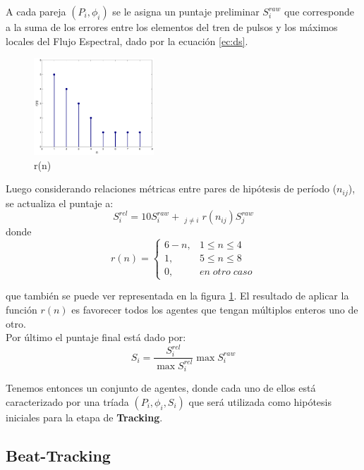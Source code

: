 \documentclass[12pt,a4paper,titlepage]{report}
\begin{document}
A cada pareja $(P_i,\phi _i)$ se le asigna un puntaje preliminar $S_i^{raw}$ que corresponde a la suma de los errores entre los elementos del tren de pulsos y los máximos locales del Flujo Espectral, dado por la ecuación \ref{ec:ds}.\\

\begin{figure}
	\vspace{-25pt}
	\begin{center}
	\includegraphics[width=0.4\textwidth]{./pics/r.pdf}
	\end{center}
	\vspace{-20pt}
	\caption{r(n)}
	\label{fig:r}
	\vspace{-35pt}
\end{figure}

Luego considerando relaciones métricas entre pares de hipótesis de período ($n_{ij}$), se actualiza el puntaje a:
$$S^{rel}_i=10S_i^{raw}+\mathop{\sum\limits_{j=0}^{N}}_{j \neq i}r(n_{ij})S_j^{raw}$$ donde 
$$r(n)= \begin{cases}
6-n, & 1\leq n \leq 4\\
1, & 5\leq n \leq 8\\
0, & en\;otro\;caso
\end{cases}
$$

que también se puede ver representada en la figura \ref{fig:r}. El resultado de aplicar la función $r(n)$ es favorecer todos los agentes que tengan múltiplos enteros uno de otro.\\

Por último el puntaje final está dado por:
\begin{equation}
S_i=\frac{S_i^{rel}}{\max S_i^{rel}}\max S_i^{raw}
\label{ec:S}
\end{equation}

Tenemos entonces un conjunto de agentes, donde cada uno de ellos está caracterizado por una tríada $(P_i,\phi _i,S_i)$ que será utilizada como hipótesis iniciales para la etapa de \textbf{Tracking}.

\subsection{Beat-Tracking}
\label{sec:tracking}
\end{document}
